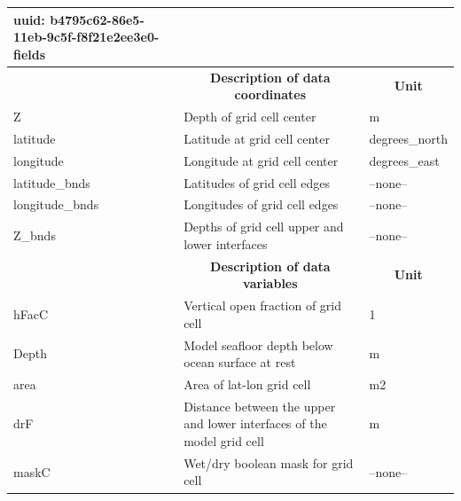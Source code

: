 \begin{longtable}{|m{}|m{}|m{}|}
{    uuid:                            b4795c62-86e5-11eb-9c5f-f8f21e2ee3e0-fields} \\ 
\hline \endhead \hline \endfoot
\rowcolor{lightgray} \multicolumn{1}{|c|}{\textbf{Coordinates}} & \multicolumn{1}{|c|}{\textbf{Description of data coordinates}} &  \multicolumn{1}{|c|}{\textbf{Unit}}\\ \hline
Z &Depth of grid cell center &m  \\ \hline
latitude &Latitude at grid cell center &degrees\_north  \\ \hline
longitude &Longitude at grid cell center &degrees\_east  \\ \hline
latitude\_bnds &Latitudes of grid cell edges &--none--  \\ \hline
longitude\_bnds &Longitudes of grid cell edges &--none--  \\ \hline
Z\_bnds &Depths of grid cell upper and lower interfaces &--none--  \\ \hline
\rowcolor{lightgray} \multicolumn{1}{|c|}{\textbf{Variables}} & \multicolumn{1}{|c|}{\textbf{Description of data variables}} &  \multicolumn{1}{|c|}{\textbf{Unit}}\\ \hline
hFacC &Vertical open fraction of grid cell &1  \\ \hline
Depth &Model seafloor depth below ocean surface at rest &m  \\ \hline
area &Area of lat-lon grid cell &m2  \\ \hline
drF &Distance between the upper and lower interfaces of the model grid cell &m  \\ \hline
maskC &Wet/dry boolean mask for grid cell &--none--  \\ \hline
\end{longtable}

\newp
\pagebreak
